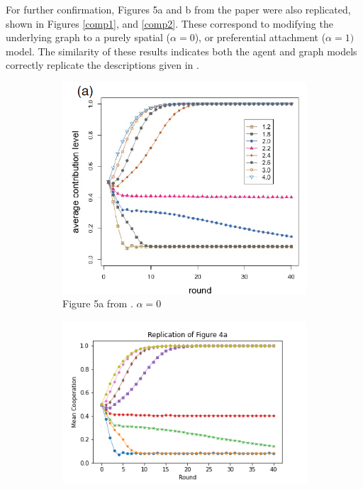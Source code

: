 For further confirmation, Figures 5a and b from the paper were also replicated, shown in Figures \ref{comp1}, and \ref{comp2}. These correspond to modifying the underlying graph to a purely spatial ($\alpha = 0$), or preferential attachment ($\alpha = 1)$ model. The similarity of these results indicates both the agent and graph models correctly replicate the descriptions given in \cite{RN49}.

\FloatBarrier
\begin{figure}[!h] 
  \begin{subfigure}[b]{0.45\textwidth}
    \includegraphics[width=\textwidth]{images/TAfig4a_real.png}
    \caption{Figure 5a from \cite{RN49}. $\alpha = 0$ }
    \label{TAfig4a_real}
  \end{subfigure}
  \hfill
  \begin{subfigure}[b]{0.45\textwidth}
    \includegraphics[width=1.35\textwidth]{images/TAfig4a.png}

\end{subfigure}
\end{figure}
